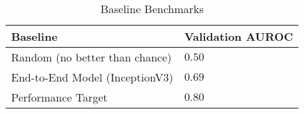\begin{table}[H]
    \centering
    \begin{tabular}{@{}ll@{}}
    \toprule
    Baseline                        & Validation AUROC \\ \midrule
    Random (no better than chance)  & \(0.50\)         \\
    End-to-End Model (InceptionV3)  & \(0.69\)         \\ 
    Performance Target  & \(0.80\)         \\ \bottomrule
    \end{tabular}
    \caption{Baseline Benchmarks}\label{tab:endpoints}
\end{table}
